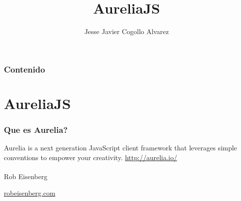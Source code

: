 \documentclass{beamer}
\title[AureliaJS]{AureliaJS}
\author{Jesse Javier Cogollo Alvarez}
\institute[EAFIT - TalosDigital]
{
Developer by passion \\
\medskip
\textit{email: cogollo87@gmail.com} \\~\\
\textit{MedellinJS}
}
\begin{document}
\begin{frame}
\titlepage %
\end{frame}

\begin{frame}
\frametitle{Contenido} %
\tableofcontents %
\end{frame}


\section{AureliaJS} %
\begin{frame}
\frametitle{Que es Aurelia?}
Aurelia is a next generation JavaScript client framework that leverages simple conventions to empower your creativity.
{\color{blue}\url{http://aurelia.io/}}
\\~\\
Rob Eisenberg

{\color{blue}\url{robeisenberg.com}}

\end{frame}
\end{document}
